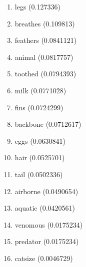 \begin{enumerate}
\item legs (0.127336)
\item breathes (0.109813)
\item feathers (0.0841121)
\item animal (0.0817757)
\item toothed (0.0794393)
\item milk (0.0771028)
\item fins (0.0724299)
\item backbone (0.0712617)
\item eggs (0.0630841)
\item hair (0.0525701)
\item tail (0.0502336)
\item airborne (0.0490654)
\item aquatic (0.0420561)
\item venomous (0.0175234)
\item predator (0.0175234)
\item catsize (0.0046729)
\end{enumerate}